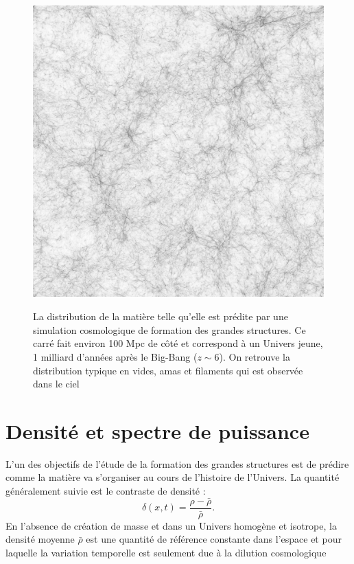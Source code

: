 \begin{figure}[htbp]
	\centering
		\includegraphics[height=12cm]{figs/simLSS.png}
		\caption[Simulation des grandes structures de l'Univers]{La distribution de la matière telle qu'elle est prédite par une simulation cosmologique de formation des grandes structures. Ce carré fait environ 100 Mpc de côté et correspond à un Univers jeune, 1 milliard d'années après le Big-Bang ($z\sim 6$). On retrouve la distribution typique en vides, amas et filaments qui est observée dans le ciel}
	\label{f:simLSS}
\end{figure}


\section{Densité et spectre de puissance}
L'un des objectifs de l'étude de la formation des grandes structures est de prédire comme la matière va s'organiser au cours de l'histoire de l'Univers. La quantité généralement suivie est le contraste de densité :
\begin{equation}
\delta(x,t) =\frac{\rho-\bar\rho}{\bar\rho}.
\end{equation}
En l'absence de création de masse et dans un Univers homogène et isotrope, la densité moyenne $\bar{\rho}$ est une quantité de référence constante dans l'espace et pour laquelle la variation temporelle est seulement due à la dilution cosmologique 

